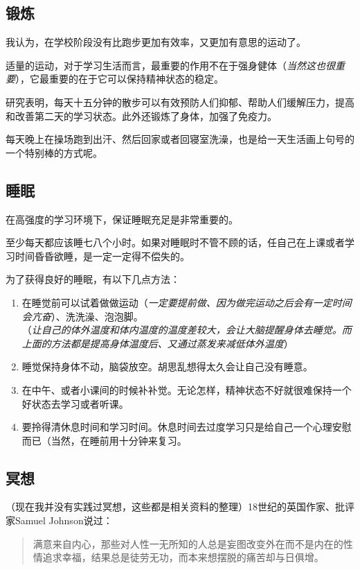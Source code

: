 \documentclass[b5paper]{ctexart}
\begin{document}
		\subsection{锻炼}
			我认为，在学校阶段没有比跑步更加有效率，又更加有意思的运动了。

			适量的运动，对于学习生活而言，最重要的作用不在于强身健体（\emph{当然这也很重要}），它最重要的在于它可以保持精神状态的稳定。

			研究表明，每天十五分钟的散步可以有效预防人们抑郁、帮助人们缓解压力，提高和改善第二天的学习状态。此外还锻炼了身体，加强了免疫力。

			每天晚上在操场跑到出汗、然后回家或者回寝室洗澡，也是给一天生活画上句号的一个特别棒的方式呢。
		\subsection{睡眠}
			在高强度的学习环境下，保证睡眠充足是非常重要的。

			至少每天都应该睡七八个小时。如果对睡眠时不管不顾的话，任自己在上课或者学习时间昏昏欲睡，是一定一定得不偿失的。

			为了获得良好的睡眠，有以下几点方法：
			\begin{enumerate}
				\item 在睡觉前可以试着做做运动（\emph{一定要提前做、因为做完运动之后会有一定时间会亢奋}）、洗洗澡、泡泡脚。\\
					（\emph{让自己的体外温度和体内温度的温度差较大，会让大脑提醒身体去睡觉。而上面的方法都是提高身体温度后、又通过蒸发来减低体外温度}）
				\item 睡觉保持身体不动，脑袋放空。胡思乱想得太久会让自己没有睡意。
				\item 在中午、或者小课间的时候补补觉。无论怎样，精神状态不好就很难保持一个好状态去学习或者听课。
				\item 要拎得清休息时间和学习时间。休息时间去过度学习只是给自己一个心理安慰而已（当然，在睡前用十分钟来复习。
			\end{enumerate}
		\subsection{冥想}
			（现在我并没有实践过冥想，这些都是相关资料的整理）18世纪的英国作家、批评家Samuel Johnson说过：
			\begin{quote}
				满意来自内心，那些对人性一无所知的人总是妄图改变外在而不是内在的性情追求幸福，结果总是徒劳无功，而本来想摆脱的痛苦却与日俱增。
			\end{quote}
\end{document}
